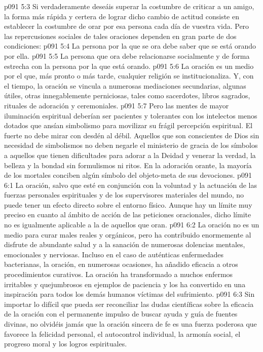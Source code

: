 \vs p091 5:3 \pc Si verdaderamente deseáis superar la costumbre de criticar a un amigo, la forma más rápida y certera de lograr dicho cambio de actitud consiste en establecer la costumbre de orar por esa persona cada día de vuestra vida. Pero las repercusiones sociales de tales oraciones dependen en gran parte de dos condiciones:
\vs p091 5:4 La persona por la que se ora debe saber que se está orando por ella.
\vs p091 5:5 La persona que ora debe relacionarse socialmente y de forma estrecha con la persona por la que está orando.
\vs p091 5:6 \pc La oración es un medio por el que, más pronto o más tarde, cualquier religión se institucionaliza. Y, con el tiempo, la oración se vincula a numerosas mediaciones secundarias, algunas útiles, otras innegablemente perniciosas, tales como sacerdotes, libros sagrados, rituales de adoración y ceremoniales.
\vs p091 5:7 Pero las mentes de mayor iluminación espiritual deberían ser pacientes y tolerantes con los intelectos menos dotados que ansían simbolismo para movilizar su frágil percepción espiritual. El fuerte no debe mirar con desdén al débil. Aquellos que son conscientes de Dios sin necesidad de simbolismos no deben negarle el ministerio de gracia de los símbolos a aquellos que tienen dificultades para adorar a la Deidad y venerar la verdad, la belleza y la bondad sin formulismos ni ritos. En la adoración orante, la mayoría de los mortales conciben algún símbolo del objeto\hyp{}meta de sus devociones.
\vs p091 6:1 La oración, salvo que esté en conjunción con la voluntad y la actuación de las fuerzas personales espirituales y de los supervisores materiales del mundo, no puede tener un efecto directo sobre el entorno físico. Aunque hay un límite muy preciso en cuanto al ámbito de acción de las peticiones oracionales, dicho límite no es igualmente aplicable a la  de aquellos que oran.
\vs p091 6:2 La oración no es un medio para curar males reales y orgánicos, pero ha contribuido enormemente al disfrute de abundante salud y a la sanación de numerosas dolencias mentales, emocionales y nerviosas. Incluso en el caso de auténticas enfermedades bacterianas, la oración, en numerosas ocasiones, ha añadido eficacia a otros procedimientos curativos. La oración ha transformado a muchos enfermos irritables y quejumbrosos en ejemplos de paciencia y los ha convertido en una inspiración para todos los demás humanos víctimas del sufrimiento.
\vs p091 6:3 Sin importar lo difícil que pueda ser reconciliar las dudas científicas sobre la eficacia de la oración con el permanente impulso de buscar ayuda y guía de fuentes divinas, no olvidéis jamás que la oración sincera de fe es una fuerza poderosa que favorece la felicidad personal, el autocontrol individual, la armonía social, el progreso moral y los logros espirituales.
